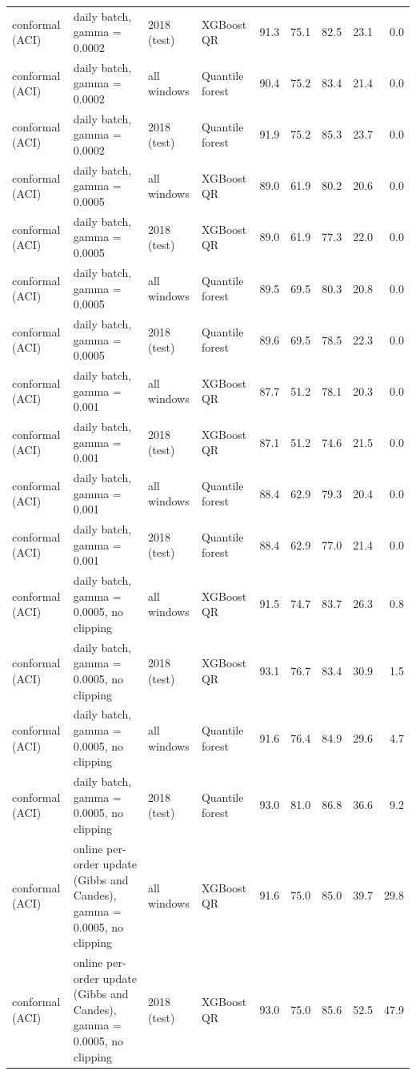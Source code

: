 \begin{table}[!htbp]
{\begin{tabular}{llllrrrrr}
conformal (ACI) & daily batch, gamma = 0.0002 & 2018 (test) & XGBoost QR & 91.3 & 75.1 & 82.5 & 23.1 & 0.0 \\
conformal (ACI) & daily batch, gamma = 0.0002 & all windows & Quantile forest & 90.4 & 75.2 & 83.4 & 21.4 & 0.0 \\
conformal (ACI) & daily batch, gamma = 0.0002 & 2018 (test) & Quantile forest & 91.9 & 75.2 & 85.3 & 23.7 & 0.0 \\
conformal (ACI) & daily batch, gamma = 0.0005 & all windows & XGBoost QR & 89.0 & 61.9 & 80.2 & 20.6 & 0.0 \\
conformal (ACI) & daily batch, gamma = 0.0005 & 2018 (test) & XGBoost QR & 89.0 & 61.9 & 77.3 & 22.0 & 0.0 \\
conformal (ACI) & daily batch, gamma = 0.0005 & all windows & Quantile forest & 89.5 & 69.5 & 80.3 & 20.8 & 0.0 \\
conformal (ACI) & daily batch, gamma = 0.0005 & 2018 (test) & Quantile forest & 89.6 & 69.5 & 78.5 & 22.3 & 0.0 \\
conformal (ACI) & daily batch, gamma = 0.001 & all windows & XGBoost QR & 87.7 & 51.2 & 78.1 & 20.3 & 0.0 \\
conformal (ACI) & daily batch, gamma = 0.001 & 2018 (test) & XGBoost QR & 87.1 & 51.2 & 74.6 & 21.5 & 0.0 \\
conformal (ACI) & daily batch, gamma = 0.001 & all windows & Quantile forest & 88.4 & 62.9 & 79.3 & 20.4 & 0.0 \\
conformal (ACI) & daily batch, gamma = 0.001 & 2018 (test) & Quantile forest & 88.4 & 62.9 & 77.0 & 21.4 & 0.0 \\
conformal (ACI) & daily batch, gamma = 0.0005, no clipping & all windows & XGBoost QR & 91.5 & 74.7 & 83.7 & 26.3 & 0.8 \\
conformal (ACI) & daily batch, gamma = 0.0005, no clipping & 2018 (test) & XGBoost QR & 93.1 & 76.7 & 83.4 & 30.9 & 1.5 \\
conformal (ACI) & daily batch, gamma = 0.0005, no clipping & all windows & Quantile forest & 91.6 & 76.4 & 84.9 & 29.6 & 4.7 \\
conformal (ACI) & daily batch, gamma = 0.0005, no clipping & 2018 (test) & Quantile forest & 93.0 & 81.0 & 86.8 & 36.6 & 9.2 \\
conformal (ACI) & online per-order update (Gibbs and Candes), gamma = 0.0005, no clipping & all windows & XGBoost QR & 91.6 & 75.0 & 85.0 & 39.7 & 29.8 \\
conformal (ACI) & online per-order update (Gibbs and Candes), gamma = 0.0005, no clipping & 2018 (test) & XGBoost QR & 93.0 & 75.0 & 85.6 & 52.5 & 47.9 \\

\end{tabular}}
\end{table}

